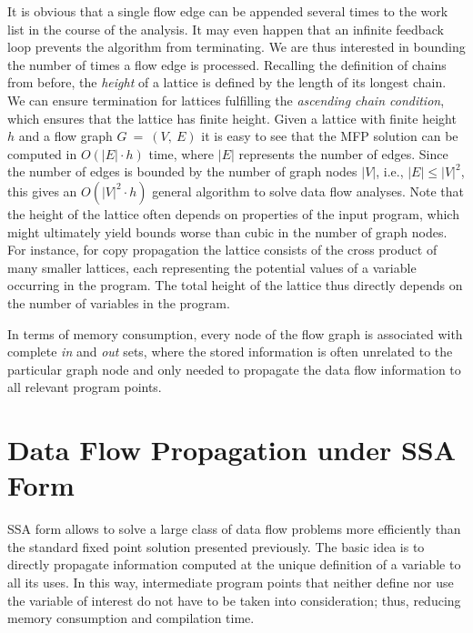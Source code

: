 It is obvious that a single flow edge can be appended several times to the
work list in the course of the analysis. It may even happen that an infinite
feedback loop prevents the algorithm from terminating. We are thus interested in
bounding the number of times a flow edge is processed. Recalling the definition
of chains from before, %
 the \emph{height} of a
lattice is defined by the length of its longest chain. We can ensure termination
for lattices fulfilling the \emph{ascending chain condition}, which ensures that
the lattice has finite height. Given a lattice with finite height $h$ and a flow
graph $G~=~(V,~E)$ it is easy to see that the MFP solution can be computed in
$O(|E| \cdot h)$ time, where $|E|$ represents the number of edges. Since the
number of edges is bounded by the number of graph nodes $|V|$,
i.e., $|E| \leq |V|^2$, this gives an $O(|V|^2 \cdot h)$ general algorithm to
solve data flow analyses. Note that the height of
the lattice often depends on properties of the input program, which might
ultimately yield bounds worse than cubic in the number of graph nodes. For
instance, for copy propagation the lattice consists of the cross product of many
smaller lattices, each representing the potential values of a variable occurring
in the program. The total height of the lattice thus directly depends on the
number of variables in the program.

In terms of memory consumption, every node of the flow graph is associated with
complete \emph{in} and \emph{out} sets, where the stored information is
often unrelated to the particular graph node and only needed to propagate the
data flow information to all relevant program points.

\section{Data Flow Propagation under SSA Form}
\label{chapter:constant_propagation_is_easier:sec:prop-engine}
\label{sec:prop-engine}

SSA form allows to solve a large class of data flow problems more efficiently
than the standard fixed point solution presented previously.
The basic idea is to directly propagate information computed at the unique
definition of a variable to all its uses. In this way, intermediate program
points that neither define nor use the variable of interest do not have to
be taken into consideration; thus, reducing memory consumption
and compilation time.

